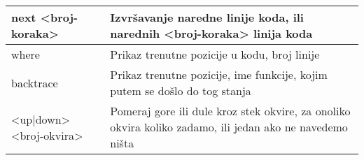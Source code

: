 \documentclass[a4paper]{article}
\begin{document}
\begin{table}[!h!]
\begin{center}
\begin{tabular}{|p{4cm}|p{6cm}|}
next <broj-koraka> & Izvršavanje naredne linije koda, ili narednih <broj-koraka> linija koda \\ \hline
where & Prikaz trenutne pozicije u kodu, broj linije \\ \hline
backtrace & Prikaz trenutne pozicije, ime funkcije, kojim putem se došlo do tog stanja\\ \hline
<up|down><broj-okvira> & Pomeraj gore ili dule kroz stek okvire, za onoliko okvira koliko zadamo, ili jedan ako ne navedemo ništa \\ \hline
\end{tabular}
\label{tab:tabelaKonzola}
\end{center}
\end{table}
\end{document}
